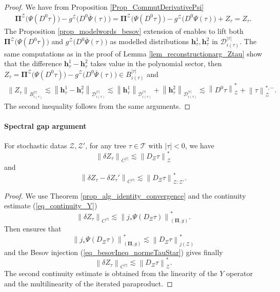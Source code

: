 \documentclass[11pt]{preprint}
\newcommand{\mcD}{\mathcal{D}}
\newcommand{\mcZ}{\mathcal{Z}}
\newcommand{\mcT}{\mathcal{T}}
\def\PPi{\boldsymbol{\Pi}}
\def\eqref#1{(\ref{#1})}
\newcommand{\norme}[1]{\left\lVert #1 \right\lVert}
\begin{document}
\begin{proof}
We have from Proposition \ref{Prop_CommutDerivativePsi} 
\begin{align*}
	\PPi^\mcZ\big(\Psi(D^0\tau)\big) - g^\mcZ\big(D^0\overline{\Psi}(\tau)\big) = \PPi^\mcZ\big(\Psi(D^0\tau)\big) - g^\mcZ\big(D^0{\Psi}(\tau)\big) + Z_\tau
	=Z_\tau.
\end{align*}
The Proposition \ref{prop_modelwords_besov} extension of  \cite[Theorem 1]{LocalExpansionsParacSystems}  enables to lift both $\PPi^\mcZ\big(\Psi(D^0\tau)\big) $ and $g^\mcZ\big(D^0\overline{\Psi}(\tau)\big)$ as modelled distributions ${\bm h}^1_\tau,{\bm h}^2_\tau$ in $\mcD^{|\tau|}_{i(\tau)}$. The same computations as in the proof of Lemma \ref{lem_reconstructionarg_Ztau} show that the difference ${\bm h}^1_\tau-{\bm h}^2_\tau$ takes value in the polynomial sector, then  $Z_\tau=\PPi^\mcZ\big(\Psi(D^0\tau)\big) - g^\mcZ\big(D^0\overline{\Psi}(\tau)\big)\in B^{|\tau|}_{i(\tau)}$ and  
\begin{align*}
	\norme{ Z_\tau }_{B^{|\tau|}_{i(\tau)}} \lesssim \norme{{\bm h}_\tau^1-{\bm h}_\tau^2}_{\mcD^{|\tau|}_{i(\tau)}}\lesssim \norme{{\bm h}_\tau^1}_{\mcD^{|\tau|}_{i(\tau)}}+\norme{{\bm h}_\tau^2}_{\mcD^{|\tau|}_{i(\tau)}}
	\lesssim  \norme{D^0\tau}_\mcZ^*+ \norme{\tau}^{*,-}_\mcZ.
\end{align*}
The second inequality follows from the same arguments.
\end{proof}

\paragraph{Spectral gap argument}

\begin{lemma}\label{lem_estimate_deltaZtau}
For stochastic datas $\mcZ,\mcZ'$, for any tree $\tau\in\mcT$ with $|\tau|<0$, we have $$\norme{\delta Z_\tau}_{C^{|\tau|}}\lesssim \norme{D_\Xi\tau}^*_\mcZ$$
and 
$$\norme{\delta Z_\tau-\delta Z_\tau'}_{C^{|\tau|}}\lesssim \norme{D_\Xi\tau}^*_{\mcZ:\mcZ'}.$$
\end{lemma}
\begin{proof}
		We use Theorem \ref{prop_alg_identity_convergence} and the continuity estimate \eqref{eq_continuity_Y}
	$$
	\norme{\delta Z_\tau}_{C^{|\tau|}}\lesssim \norme{j_*\Psi(D_\Xi\tau)}_{ (\PPi,g)}^*.
	$$
	Then \cite[Theorem 1]{LocalExpansionsParacSystems} ensures that
	$$
	\norme{j_*\Psi(D_\Xi\tau)}_{ (\PPi,g)}^* \lesssim \norme{D_\Xi\tau}^*_{j(\mcZ)}
	$$
	and the Besov injection \eqref{eq_besovIneq_normeTauStar} gives finally
	$$
	\norme{\delta Z_\tau}_{C^{|\tau|}} \lesssim \norme{D_\Xi\tau}^*_{\mcZ}.
	$$
	The second continuity estimate is obtained from the linearity of the $Y$ operator and the multilinearity of the iterated paraproduct.
\end{proof}
\end{document}
